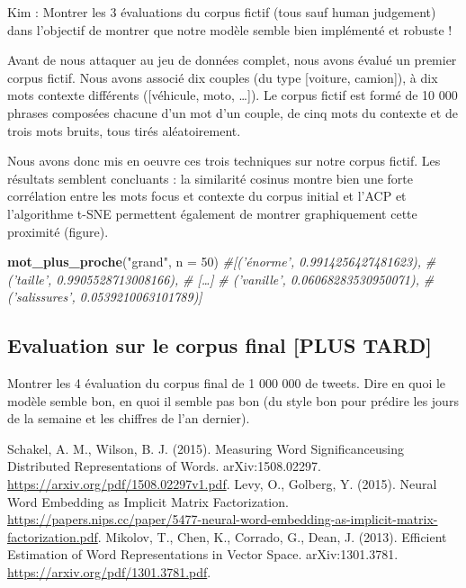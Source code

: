 \documentclass[11pt,french,french]{article}
\newenvironment{Shaded}{\begin{snugshade}}{\end{snugshade}}
\newcommand{\CommentTok}[1]{\textcolor[rgb]{0.56,0.35,0.01}{\textit{#1}}}
\newcommand{\DataTypeTok}[1]{\textcolor[rgb]{0.13,0.29,0.53}{#1}}
\newcommand{\DecValTok}[1]{\textcolor[rgb]{0.00,0.00,0.81}{#1}}
\newcommand{\KeywordTok}[1]{\textcolor[rgb]{0.13,0.29,0.53}{\textbf{#1}}}
\newcommand{\NormalTok}[1]{#1}
\newcommand{\StringTok}[1]{\textcolor[rgb]{0.31,0.60,0.02}{#1}}
\begin{document}
Kim : Montrer les 3 évaluations du corpus fictif (tous sauf human
judgement) dans l'objectif de montrer que notre modèle semble bien
implémenté et robuste !

Avant de nous attaquer au jeu de données complet, nous avons évalué un
premier corpus fictif. Nous avons associé dix couples (du type
{[}voiture, camion{]}), à dix mots contexte différents ({[}véhicule,
moto, \dots{]}). Le corpus fictif est formé de 10 000 phrases composées
chacune d'un mot d'un couple, de cinq mots du contexte et de trois mots
bruits, tous tirés aléatoirement.

Nous avons donc mis en oeuvre ces trois techniques sur notre corpus
fictif. Les résultats semblent concluants : la similarité cosinus montre
bien une forte corrélation entre les mots focus et contexte du corpus
initial et l'ACP et l'algorithme t-SNE permettent également de montrer
graphiquement cette proximité (figure).

\footnotesize

\begin{Shaded}
\begin{Highlighting}[]
\KeywordTok{mot_plus_proche}\NormalTok{(}\StringTok{"grand"}\NormalTok{, }\DataTypeTok{n =} \DecValTok{50}\NormalTok{)}
\CommentTok{#[('énorme', 0.9914256427481623),}
\CommentTok{# ('taille', 0.9905528713008166),}
\CommentTok{# […]}
\CommentTok{# ('vanille', 0.06068283530950071),}
\CommentTok{# ('salissures', 0.0539210063101789)]}
\end{Highlighting}
\end{Shaded}

\normalsize

\hypertarget{evaluation-sur-le-corpus-final-plus-tard}{%
\subsection{Evaluation sur le corpus final {[}PLUS
TARD{]}}\label{evaluation-sur-le-corpus-final-plus-tard}}

Montrer les 4 évaluation du corpus final de 1 000 000 de tweets. Dire en
quoi le modèle semble bon, en quoi il semble pas bon (du style bon pour
prédire les jours de la semaine et les chiffres de l'an dernier).

\nocite{*}

\begin{thebibliography}{999}
 Schakel, A. M., Wilson, B. J. (2015). Measuring Word Significanceusing Distributed Representations of Words. arXiv:1508.02297. \url{https://arxiv.org/pdf/1508.02297v1.pdf}.
 Levy, O., Golberg, Y. (2015). Neural Word Embedding as Implicit Matrix Factorization.
\url{https://papers.nips.cc/paper/5477-neural-word-embedding-as-implicit-matrix-factorization.pdf}.
 Mikolov, T.,  Chen, K., Corrado, G., Dean, J. (2013). Efficient Estimation of Word Representations in Vector Space. arXiv:1301.3781. \url{https://arxiv.org/pdf/1301.3781.pdf}.
\end{thebibliography}
\end{document}
